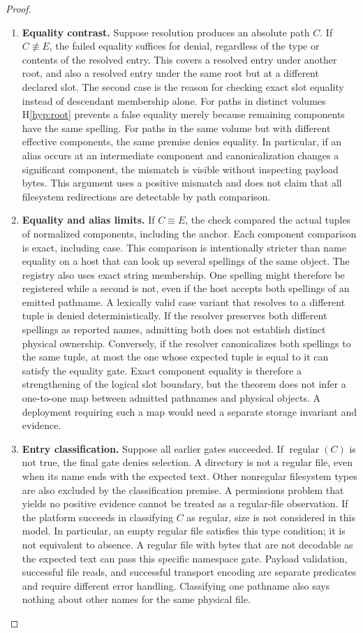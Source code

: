 \documentclass[12pt]{article}
\newcommand{\regular}{\operatorname{regular}}
\begin{document}
\begin{proof}
\begin{enumerate}
\item \textbf{Equality contrast.}
Suppose resolution produces an absolute path $C$. If $C\not\equiv E$,
the failed equality suffices for denial, regardless of the type or
contents of the resolved entry. This covers a resolved entry under
another root, and also a resolved entry under the same root but at a
different declared slot. The second case is the reason for checking
exact slot equality instead of descendant membership alone.
For paths in distinct volumes H\ref{hyp:root} prevents a false
equality merely because remaining components have the same spelling.
For paths in the same volume but with different effective components,
the same premise denies equality. In particular, if an alias occurs
at an intermediate component and canonicalization changes a
significant component, the mismatch is visible without inspecting
payload bytes. This argument uses a positive mismatch and does not
claim that all filesystem redirections are detectable by path
comparison.

\item \textbf{Equality and alias limits.}
If $C\equiv E$, the check compared the actual tuples of
normalized components, including the anchor. Each component
comparison is exact, including case. This comparison is
intentionally stricter than name equality on a host that can
look up several spellings of the same object.
The registry also uses exact string membership. One spelling
might therefore be registered while a second is not, even if
the host accepts both spellings of an emitted pathname.
A lexically valid case variant that resolves to a different
tuple is denied deterministically. If the resolver preserves
both different spellings as reported names, admitting both
does not establish distinct physical ownership. Conversely, if
the resolver canonicalizes both spellings to the same tuple,
at most the one whose expected tuple is equal to it can satisfy
the equality gate. Exact component equality is therefore a
strengthening of the logical slot boundary, but the theorem
does not infer a one-to-one map between admitted pathnames
and physical objects. A deployment requiring such a map
would need a separate storage invariant and evidence.

\item \textbf{Entry classification.}
Suppose all earlier gates succeeded. If $\regular(C)$ is not true,
the final gate denies selection. A directory is not a regular file,
even when its name ends with the expected text. Other nonregular
filesystem types are also excluded by the classification premise.
A permissions problem that yields no positive evidence cannot be
treated as a regular-file observation. If the platform succeeds in
classifying $C$ as regular, size is not considered in this model.
In particular, an empty regular file satisfies this type condition;
it is not equivalent to absence. A regular file with bytes that are
not decodable as the expected text can pass this specific namespace
gate. Payload validation, successful file reads, and successful
transport encoding are separate predicates and require different
error handling. Classifying one pathname also says nothing about
other names for the same physical file.


\end{enumerate}
\end{proof}
\end{document}
